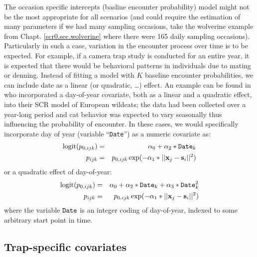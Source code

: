 The 
occasion specific intercepts (basline encounter probability) model might not be the most
appropriate for all scenarios (and could require the estimation of
many parameters if we had many sampling occasions, take the wolverine
example from Chapt. \ref{scr0.sec.wolverine} where there were 165
daily sampling occasions).  Particularly in such a case, variation in
the encounter process over time is to be expected. For
example, if a camera trap study is conducted for an entire year, it is
expected that there would be behavioral patterns in individuals due to 
mating or denning. Instead of fitting a model with $K$ baseline
encounter probabilities, we can include date as a linear (or
quadratic, \ldots) effect. An example can be found in
\citet{kery_etal:2011} who incorporated a day-of-year covariate, both
as a linear and a quadratic effect, into their SCR model of European
wildcats; the data had been collected over a year-long period and cat
behavior was expected to vary seasonally thus influencing the
probability of encounter.  In these cases, we would specifically
incorporate day of year (variable ``\mbox{\tt Date}'') as a numeric
covariate as:
\begin{eqnarray*}
\mbox{logit}(p_{0,ijk}) &=& \alpha_0 + \alpha_2*\mbox{\tt Date}_{k} \\
p_{ijk} &= &p_{0, ijk} \exp(- \alpha_1*||{\bf x}_{j}-{\bf s}_{i}||^2)
\end{eqnarray*}
or a quadratic effect of day-of-year:
\begin{eqnarray*}
\mbox{logit}(p_{0,ijk})& =& \alpha_0 + \alpha_2*\mbox{\tt Date}_{k}
 + \alpha_3*\mbox{\tt Date}_{k}^{2} \\
p_{ijk} &= &p_{0,ijk} \exp(- \alpha_{1}*||{\bf x}_{j}-{\bf s}_{i}||^2)
\end{eqnarray*}
where the variable $\mbox{\tt Date}$ is an integer coding of
day-of-year, indexed to some arbitrary start point in time.



\subsection{Trap-specific covariates}

